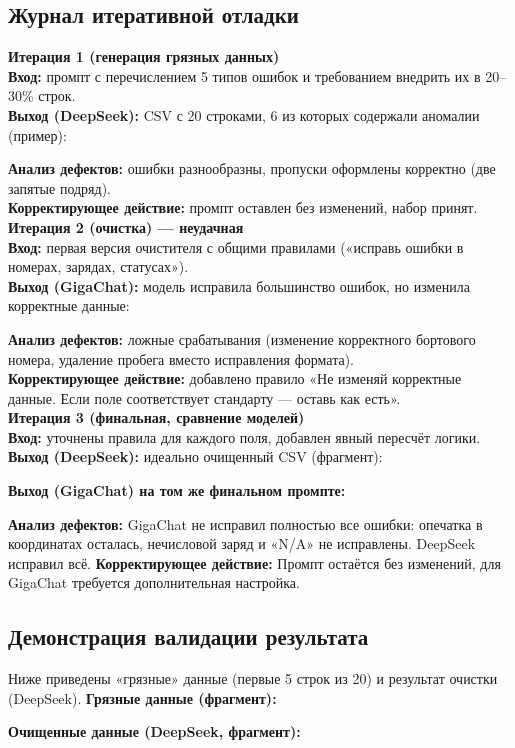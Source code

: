 \documentclass[oneside,a4paper,14pt]{extarticle} %
\begin{document}
	\subsection{Журнал итеративной отладки}
	\noindent
	\textbf{Итерация 1 (генерация грязных данных)} \\
	\noindent
	\textbf{Вход:} промпт с перечислением 5 типов ошибок и требованием внедрить их в 20--30\% строк. \\
	\noindent
	\textbf{Выход (DeepSeek):} CSV с 20 строками, 6 из которых содержали аномалии (пример):
	
	\noindent
	\textbf{Анализ дефектов:} ошибки разнообразны, пропуски оформлены корректно (две запятые подряд). \\
	\noindent
	\textbf{Корректирующее действие:} промпт оставлен без изменений, набор принят.
	\newpage
	\noindent
	\textbf{Итерация 2 (очистка) --- неудачная} \\
	\noindent
	\textbf{Вход:} первая версия очистителя с общими правилами («исправь ошибки в номерах, зарядах, статусах»). \\
	\noindent
	\textbf{Выход (GigaChat):} модель исправила большинство ошибок, но изменила корректные данные:
	
	\noindent
	\textbf{Анализ дефектов:} ложные срабатывания (изменение корректного бортового номера, удаление пробега вместо исправления формата). \\
	\noindent
	\textbf{Корректирующее действие:} добавлено правило «Не изменяй корректные данные. Если поле соответствует стандарту --- оставь как есть». \\
	\newline
	\noindent
	\textbf{Итерация 3 (финальная, сравнение моделей)} \\
	\noindent
	\textbf{Вход:} уточнены правила для каждого поля, добавлен явный пересчёт логики. \\
	\noindent
	\textbf{Выход (DeepSeek):} идеально очищенный CSV (фрагмент):
	
	\newpage
	\noindent
	\textbf{Выход (GigaChat) на том же финальном промпте:}
	
	\noindent
	\textbf{Анализ дефектов:} GigaChat не исправил полностью все ошибки: опечатка в координатах осталась, нечисловой заряд и «N/A» не исправлены. DeepSeek исправил всё.
	\noindent
	\textbf{Корректирующее действие:} Промпт остаётся без изменений, для GigaChat требуется дополнительная настройка.
	\subsection{Демонстрация валидации результата}
	\noindent
	Ниже приведены «грязные» данные (первые 5 строк из 20) и результат очистки (DeepSeek).
	\noindent
	\textbf{Грязные данные (фрагмент):}
	
	\noindent
	\textbf{Очищенные данные (DeepSeek, фрагмент):}
	
\end{document}
